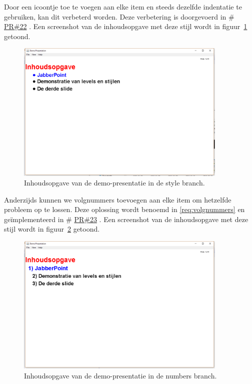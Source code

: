 \documentclass[a4paper]{article}
\makeatletter
\newcommand*{\repo}{\begingroup\@makeother\#\@repo}
\newcommand*{\@repo}[2]{%
  \href{https://github.com/DanielSchiavini/design-patterns-assignment/#1}{#2}%
  \endgroup}
\newcommand{\PR}[1]{\repo{pull/#1}{PR\##1}}
\newcommand{\reqref}[1]{\ref{req:#1}}
\makeatother
\begin{document}
    Door een icoontje toe te voegen aan elke item en steeds dezelfde indentatie te gebruiken, kan dit verbeterd worden.
    Deze verbetering is doorgevoerd in \PR{22}.
    Een screenshot van de inhoudsopgave met deze stijl wordt in figuur~\ref{fig:style} getoond.
    \begin{figure}[!htb]
     \caption{
        Inhoudsopgave van de demo-presentatie in de style branch.\label{fig:style}
     }
     \centering \includegraphics[width=0.9\textwidth]{Screenshots/style.png}
    \end{figure}

    Anderzijds kunnen we volgnummers toevoegen aan elke item om hetzelfde probleem op te lossen.
    Deze oplossing wordt benoemd in \reqref{volgnummers} en ge\-ïmple\-men\-teerd in \PR{23}.
    Een screenshot van de inhoudsopgave met deze stijl wordt in figuur~\ref{fig:numbers} getoond.
    \begin{figure}[!htb]
     \caption{
        Inhoudsopgave van de demo-presentatie in de numbers branch.\label{fig:numbers}
     }
     \centering \includegraphics[width=0.9\textwidth]{Screenshots/numbers.png}
    \end{figure}
    
\end{document}
